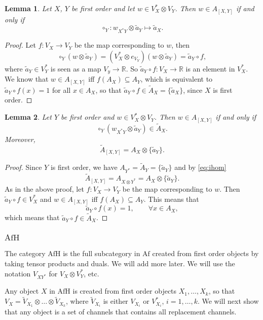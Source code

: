 \documentclass[12pt]{article}
\newtheorem{lemma}{Lemma}
\theoremstyle{definition}
\theoremstyle{remark}
\def \Afh{\mathrm{AfH}}
\def \Af{\mathrm{Af}}
\begin{document}
\begin{lemma}\label{lemma:channels} Let $X$, $Y$ be first order and let  $w\in V_X^*\otimes V_Y$. Then $w
\in A_{[X,Y]}$ if and only if
\[
\circ_Y :w_{X^*Y}\otimes \tilde a_Y\mapsto \tilde a_X.
\]
\end{lemma}

\begin{proof} Let $f:V_X\to V_Y$ be the map corresponding to $w$, then 
\[
\circ_Y(w\otimes \tilde a_Y)=(V_X^*\otimes e_{V_Y})(w\otimes \tilde a_Y)=\tilde a_Y\circ
f,
\]
where $\tilde a_Y\in V_Y^*$ is seen as a map $V_y\to \mathbb R$. So $\tilde a_Y\circ f:
V_X\to \mathbb R$ is an element in $V_X^*$. We know that $w\in A_{[X,Y]}$ iff
$f(A_X)\subseteq A_Y$, which is equivalent to  $\tilde a_Y\circ f(x)=1$ for all $x\in A_X$, so
that $\tilde a_Y\circ f\in \tilde A_X=\{\tilde a_X\}$, since $X$ is first order.  
\end{proof}

\begin{lemma}\label{lemma:mapsdual} Let $Y$ be first order and $w\in V_X^*\otimes V_Y$.
Then $w\in A_{[X,Y]}$ if and only if
\[
\circ_Y(w_{X^*Y}\otimes \tilde a_Y)\in \tilde A_X.
\]
Moreover, 
\[
\tilde A_{[X,Y]}=A_X\otimes \{\tilde a_Y\}.
\]


\end{lemma}

\begin{proof} Since $Y$ is first order, we have $A_{Y^*}=\tilde A_Y=\{\tilde a_Y\}$ and by
\eqref{eq:ihom}
\[
\tilde A_{[X,Y]}=A_{X\otimes Y^*}=A_X\otimes \{\tilde a_Y\}.
\]
As in the above proof, let $f:V_X\to V_Y$ be the map corresponding to $w$. Then $\tilde
a_Y\circ f\in V_X^*$ and $w\in A_{[X,Y]}$ iff $f(A_X)\subseteq A_Y$. This means that
\[
\tilde a_Y\circ f(x)=1,\qquad \forall x\in A_X,
\]
which means that $\tilde a_Y\circ f\in \tilde A_X$.

\end{proof}

\subsubsection{$\Afh$}

The category $\Afh$ is the full subcategory in $\Af$ created from first order objects by
taking tensor products and duals. We will add more later. We will use the notation
$V_{XY^*}$ for $V_X\otimes V^*_Y$, etc. 

Any object $X$ in $\Afh$ is created from first order objects $X_1,\dots, X_k$, so that
$V_X=\tilde V_{X_1}\otimes\dots\otimes \tilde V_{X_k}$, where $\tilde V_{X_i}$ is either
$V_{X_i}$ or $V^*_{X_i}$, $i=1,\dots,k$. We will next show that any object is a set of
channels that contains all replacement channels. 
\end{document}
